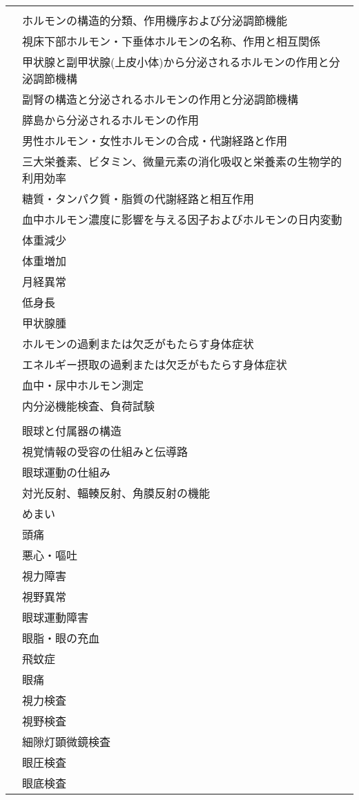 \begin{xltabular}{\linewidth}{XX}
 &  \\
 & ホルモンの構造的分類、作用機序および分泌調節機能 \\
 & 視床下部ホルモン・下垂体ホルモンの名称、作用と相互関係 \\
 & 甲状腺と副甲状腺(上皮小体)から分泌されるホルモンの作用と分泌調節機構 \\
 & 副腎の構造と分泌されるホルモンの作用と分泌調節機構 \\
 & 膵島から分泌されるホルモンの作用 \\
 & 男性ホルモン・女性ホルモンの合成・代謝経路と作用 \\
 & 三大栄養素、ビタミン、微量元素の消化吸収と栄養素の生物学的利用効率 \\
 & 糖質・タンパク質・脂質の代謝経路と相互作用 \\
 & 血中ホルモン濃度に影響を与える因子およびホルモンの日内変動 \\
 & 体重減少 \\
 & 体重増加 \\
 & 月経異常 \\
 & 低身長 \\
 & 甲状腺腫 \\
 & ホルモンの過剰または欠乏がもたらす身体症状 \\
 & エネルギー摂取の過剰または欠乏がもたらす身体症状 \\
 & 血中・尿中ホルモン測定 \\
 & 内分泌機能検査、負荷試験 \\
 &  \\
 & 眼球と付属器の構造 \\
 & 視覚情報の受容の仕組みと伝導路 \\
 & 眼球運動の仕組み \\
 & 対光反射、輻輳反射、角膜反射の機能 \\
 & めまい \\
 & 頭痛 \\
 & 悪心・嘔吐 \\
 & 視力障害 \\
 & 視野異常 \\
 & 眼球運動障害 \\
 & 眼脂・眼の充血 \\
 & 飛蚊症 \\
 & 眼痛 \\
 & 視力検査 \\
 & 視野検査 \\
 & 細隙灯顕微鏡検査 \\
 & 眼圧検査 \\
 & 眼底検査 \\

\end{xltabular}
